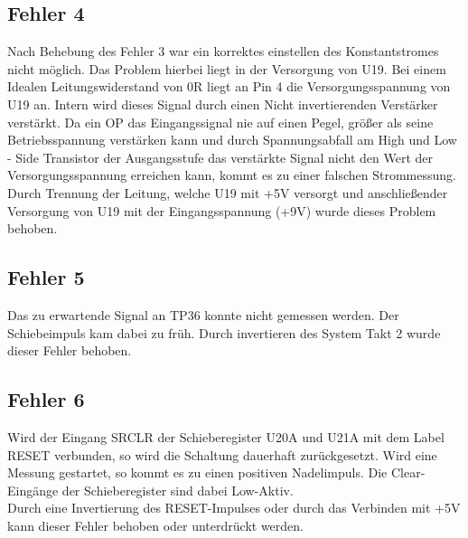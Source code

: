 \subsection{Fehler 4}

Nach Behebung des \glqq Fehler 3 \grqq{} war ein korrektes einstellen des Konstantstromes nicht möglich. Das Problem hierbei liegt in der Versorgung von U19. Bei einem Idealen Leitungswiderstand von 0R liegt an Pin 4 die Versorgungsspannung von U19 an. Intern wird dieses Signal durch einen \glqq Nicht invertierenden Verstärker \grqq{} verstärkt. Da ein OP das Eingangssignal nie auf einen Pegel, größer als seine Betriebsspannung verstärken kann und durch Spannungsabfall am \glqq High und Low - Side Transistor \grqq{} der Ausgangsstufe das verstärkte Signal nicht den Wert der Versorgungsspannung erreichen kann, kommt es zu einer falschen Strommessung. Durch Trennung der Leitung, welche U19 mit +5V versorgt und anschließender Versorgung von U19 mit der Eingangsspannung (+9V) wurde dieses Problem behoben. 

\newpage

\subsection{Fehler 5}

Das zu erwartende Signal an TP36 konnte nicht gemessen werden. Der Schiebeimpuls kam dabei zu früh. Durch invertieren des \glqq System Takt 2 \grqq{} wurde dieser Fehler behoben.



\subsection{Fehler 6}


Wird der Eingang \glqq SRCLR \grqq{} der Schieberegister U20A und U21A mit dem Label \glqq RESET \grqq{} verbunden, so wird die Schaltung dauerhaft zurückgesetzt. 
Wird eine Messung gestartet, so kommt es zu einen positiven Nadelimpuls. Die \glqq Clear-Eingänge \grqq{} der Schieberegister sind dabei Low-Aktiv. 
\\
Durch eine Invertierung des RESET-Impulses oder durch das Verbinden mit +5V kann dieser Fehler behoben oder unterdrückt werden.
